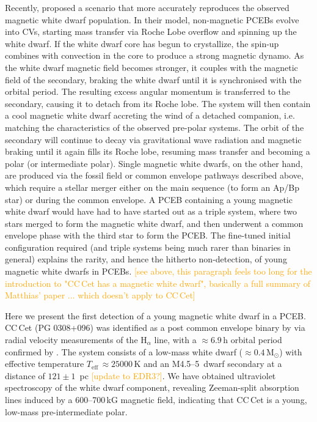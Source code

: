\documentclass[fleqn,usenatbib]{mnras}
\newcommand{\Msun}{\mbox{$\mathrm{M}_{\odot}$}}
\newcommand{\Teff}{\mbox{$T_{\mathrm{eff}}$}}
\newcommand{\bgc}[1]{\textcolor{orange}{[#1]}}
\begin{document}
Recently, \citet{schreiberetal21-1} proposed a scenario that more accurately reproduces the observed magnetic white dwarf population. In their model, non-magnetic PCEBs evolve into CVs, starting mass transfer via Roche Lobe overflow and spinning up the white dwarf. If the white dwarf core has begun to crystallize, the spin-up combines with convection in the core to produce a strong magnetic dynamo. As the white dwarf magnetic field becomes stronger, it couples with the magnetic field of the secondary, braking the white dwarf until it is synchronised with the orbital period. The resulting excess angular momentum  is transferred to the secondary, causing it to detach from its Roche lobe. The system will then contain a cool magnetic white dwarf accreting the wind of a detached companion, i.e. matching the characteristics of the observed pre-polar systems. The orbit of the secondary will continue to decay via gravitational wave radiation and magnetic braking until it again fills its Roche lobe, resuming mass transfer and becoming a polar (or intermediate polar). Single magnetic white dwarfs, on the other hand, are produced via the fossil field or common envelope pathways described above, which require a stellar merger either on the main sequence (to form an Ap/Bp star) or during the common envelope. A PCEB containing a young magnetic white dwarf would have had to have started out as a triple system, where two stars merged to form the magnetic white dwarf, and then underwent a common envelope phase with the third star to form the PCEB. The fine-tuned initial configuration required (and triple systems being much rarer than binaries in general) explains the rarity, and hence the hitherto non-detection, of young magnetic white dwarfs in PCEBs.   \bgc{see above, this paragraph feels too long for the introduction to "CC\,Cet has a magnetic white dwarf", basically a full summary of Matthias' paper ... which doesn't apply to CC\,Cet}

Here we present the first detection of a young magnetic white dwarf in a PCEB. CC\,Cet (PG 0308+096) was identified as a post common envelope binary by \citet{safferetal93-1} via radial velocity measurements of the H$_{\alpha}$ line, with a $\approx 6.9$\,h orbital period confirmed by \citet{somersetal96-2}. The system consists of a low-mass white dwarf ($\approx 0.4$\,\Msun) with effective temperature \Teff\,$\approx 25000$\,K and an M4.5--5\, dwarf secondary \citep{tappertetal07-2} at a distance of $121\pm 1$~pc \citep{gaia18-1} \bgc{update to EDR3?}. We have obtained ultraviolet spectroscopy of the white dwarf component, revealing Zeeman-split absorption lines induced by a 600--700\,kG magnetic field, indicating that CC\,Cet is a young, low-mass pre-intermediate polar. 
\end{document}
